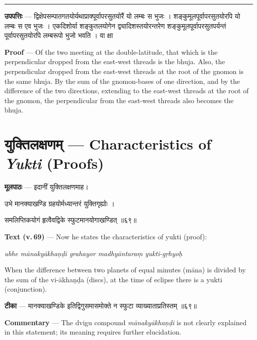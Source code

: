 \documentclass[11pt,a4paper]{article}
\newcommand{\dev}[1]{{\devanagarifont #1}}
\newcommand{\skt}[1]{{\devanagarifont\color{sktcolor} #1}}
\newenvironment{bilingual}{%
  \par\noindent
  \begin{minipage}[t]{0.47\textwidth}%
}{%
  \par\end{minipage}%
}
\newcommand{\rightcol}{%
  \par\end{minipage}%
  \hfill
  \begin{minipage}[t]{0.47\textwidth}%
}
\begin{document}
\medskip
\noindent\rule{\textwidth}{0.4pt}

\begin{bilingual}
\textbf{उपपत्तिः} --- \skt{द्विक्षेपसम्पातगतयोर्यथाप्राक्पूर्वापरसुतयोरैं यो लम्बः स भुजः} । शङ्कुमूलपूर्वापरसुतयोरपि यो लम्बः स एव भुजः । एकदिशोर्या शङ्कुतलयोगेन द्व्यादिशस्तयोरन्तरेण शङ्कुमूलपूर्वापरसुतपर्यन्तं पूर्वापरसुतयोरपि लम्बरूपो भुजो भवति । वा क्षा
\rightcol
\textbf{Proof} --- Of the two meeting at the double-latitude, that which is the perpendicular dropped from the east-west threads is the bhuja. Also, the perpendicular dropped from the east-west threads at the root of the gnomon is the same bhuja. By the sum of the gnomon-bases of one direction, and by the difference of the two directions, extending to the east-west threads at the root of the gnomon, the perpendicular from the east-west threads also becomes the bhuja.
\end{bilingual}


\newpage
\section[\dev{युक्तिलक्षणम्}]{\dev{युक्तिलक्षणम्} --- Characteristics of \textit{Yukti} (Proofs)}

\begin{bilingual}
\textbf{मूलपाठः} --- इदानीं युक्तिलक्षणमाह।

\skt{उभे मानक्याखण्डि ग्रहयोर्मध्यान्तरं युक्तिगृह्योः} ।

\skt{समलिप्तिकयोगं हृत्वैवद्विके स्फुटमानयोगाखण्डित्} ॥६९॥
\rightcol
\textbf{Text (v.\,69)} --- Now he states the characteristics of yukti (proof):

\textit{ubhe mānakyākhaṇḍi grahayor madhyāntaraṃ yukti-gṛhyoḥ}

When the difference between two planets of equal minutes (māna) is divided by the sum of the vi-ākhaṇḍa (discs), at the time of eclipse there is a yukti (conjunction).
\end{bilingual}

\medskip

\begin{bilingual}
\textbf{टीका} --- \skt{मानक्याखण्डिके} इतिद्विगुसमासमोक्ते न स्फुटा व्याख्याताप्रतिस्तम् ॥६९॥
\rightcol
\textbf{Commentary} --- The dvigu compound \textit{mānakyākhaṇḍi} is not clearly explained in this statement; its meaning requires further elucidation.
\end{bilingual}
\end{document}
